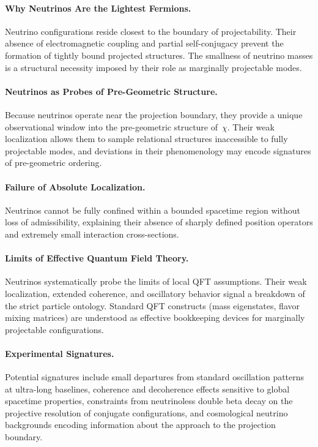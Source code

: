 \paragraph{Why Neutrinos Are the Lightest Fermions.}
\label{subsec:why-neutrinos-are-lightest-fermions}
Neutrino configurations reside closest to the boundary of
projectability.
Their absence of electromagnetic coupling and partial self-conjugacy
prevent the formation of tightly bound projected structures.
The smallness of neutrino masses is a structural necessity imposed by
their role as marginally projectable modes.

\paragraph{Neutrinos as Probes of Pre-Geometric Structure.}
\label{subsec:neutrinos-as-probes-of-pregeometric-structure}
Because neutrinos operate near the projection boundary, they provide a
unique observational window into the pre-geometric structure of~$\chi$.
Their weak localization allows them to sample relational structures
inaccessible to fully projectable modes, and deviations in their
phenomenology may encode signatures of pre-geometric ordering.

\paragraph{Failure of Absolute Localization.}
\label{subsec:neutrinos-failure-of-absolute-localization}
Neutrinos cannot be fully confined within a bounded spacetime region
without loss of admissibility, explaining their absence of sharply
defined position operators and extremely small interaction
cross-sections.

\paragraph{Limits of Effective Quantum Field Theory.}
\label{subsec:neutrinos-limits-of-qft}
Neutrinos systematically probe the limits of local QFT assumptions.
Their weak localization, extended coherence, and oscillatory behavior
signal a breakdown of the strict particle ontology.
Standard QFT constructs (mass eigenstates, flavor mixing matrices) are
understood as effective bookkeeping devices for marginally projectable
configurations.

\paragraph{Experimental Signatures.}
\label{subsec:experimental-signatures-projective-neutrinos}
Potential signatures include small departures from standard oscillation
patterns at ultra-long baselines, coherence and decoherence effects
sensitive to global spacetime properties, constraints from neutrinoless
double beta decay on the projective resolution of conjugate
configurations, and cosmological neutrino backgrounds encoding
information about the approach to the projection boundary.

